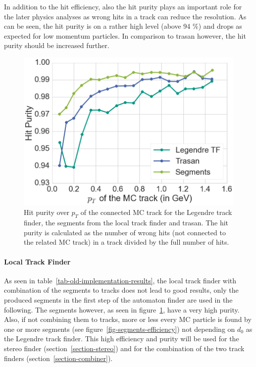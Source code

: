 In addition to the hit efficiency, also the hit purity plays an important role for the later physics analyses as wrong hits in a track can reduce the resolution. As can be seen, the hit purity is on a rather high level (above 94 \%) and drops as expected for low momentum particles. In comparison to trasan however, the hit purity should be increased further.

\begin{figure}
  \centering
  \includegraphics[width=0.7\linewidth]{figures/workflow/segment_purity.png}
  \caption{Hit purity over $p_T$ of the connected MC track for the Legendre track finder, the segments from the local track finder and trasan. The hit purity is calculated as the number of wrong hits (not connected to the related MC track) in a track divided by the full number of hits.}
  \label{fig-legendre-purity}
\end{figure}


\paragraph{Local Track Finder}

As seen in table~\ref{tab-old-implementation-results}, the local track finder with combination of the segments to tracks does not lead to good results, only the produced segments in the first step of the automaton finder are used in the following. The segments however, as seen in figure~\ref{fig-legendre-purity}, have a very high purity. Also, if not combining them to tracks, more or less every MC particle is found by one or more segments (see figure~\ref{fig-segments-efficiency}) not depending on $d_0$ as the Legendre track finder. This high efficiency and purity will be used for the stereo finder (section~\ref{section-stereo}) and for the combination of the two track finders (section~\ref{section-combiner}).

